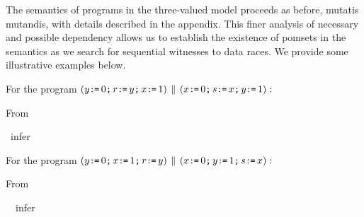 The semantics of programs in the three-valued model proceeds as before, mutatis mutandis, with details described in the appendix.  This finer analysis of necessary and possible dependency allows us to establish the existence of pomsets in the semantics as we search for sequential witnesses to data races.    We provide some illustrative examples below.


For the program
\begin{math}
(y\texttt{:}\mkern-1mu\texttt{=}\, 0 \texttt{;}\, r \texttt{:}\mkern-1mu\texttt{=}\, y  \texttt{;}\, x \texttt{:}\mkern-1mu\texttt{=}\, 1) \,\mathbin{\|}\,
(x\texttt{:}\mkern-1mu\texttt{=}\, 0 \texttt{;}\, s \texttt{:}\mkern-1mu\texttt{=}\, x \texttt{;}\, y \texttt{:}\mkern-1mu\texttt{=}\, 1):
\end{math}
\begin{displaymathsmall}
\mbox{From    }
\qquad\qquad
\begin{tikzcenter}[node distance=1em]
\end{tikzcenter}
\qquad
\mbox{  infer  }
\qquad
\begin{tikzcenter}[node distance=1em]
\end{tikzcenter}
\end{displaymathsmall}
For the program
\begin{math}
  (y\texttt{:}\mkern-1mu\texttt{=}\, 0 \texttt{;}\,   x \texttt{:}\mkern-1mu\texttt{=}\, 1  \texttt{;}\, r \texttt{:}\mkern-1mu\texttt{=}\, y)
  \,\mathbin{\|}\,
  (x\texttt{:}\mkern-1mu\texttt{=}\, 0 \texttt{;}\,  y \texttt{:}\mkern-1mu\texttt{=}\, 1  \texttt{;}\,  s \texttt{:}\mkern-1mu\texttt{=}\, x):
\end{math}
\begin{displaymathsmall}
\mbox{From  }
\qquad \qquad
\begin{tikzcenter}[node distance=1em]
\end{tikzcenter}
\qquad
\ \mbox{ infer }
\qquad
\begin{tikzcenter}[node distance=1em]
\end{tikzcenter}
\end{displaymathsmall}
